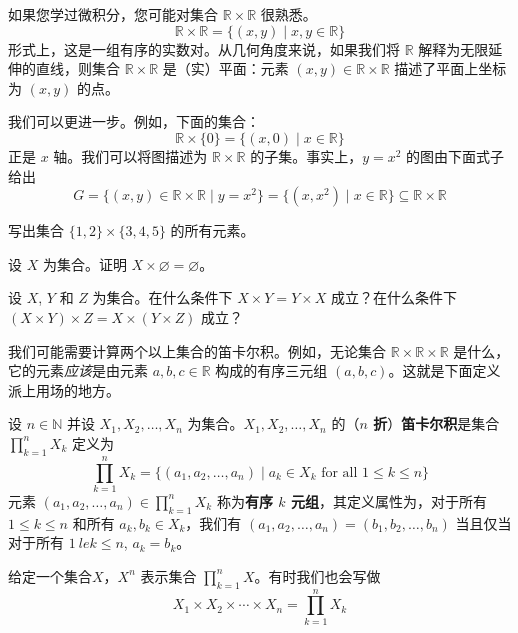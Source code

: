 \begin{example}
如果您学过微积分，您可能对集合 $\mathbb{R} \times \mathbb{R}$ 很熟悉。
\[ \mathbb{R} \times \mathbb{R} = \{ (x,y) \mid x,y \in \mathbb{R} \} \]
形式上，这是一组有序的实数对。从几何角度来说，如果我们将 $\mathbb{R}$ 解释为无限延伸的直线，则集合 $\mathbb{R} \times \mathbb{R}$ 是（实）平面：元素 $(x,y) \in \mathbb{R} \times \mathbb{R}$ 描述了平面上坐标为 $(x,y)$ 的点。

我们可以更进一步。例如，下面的集合：
\[ \mathbb{R} \times \{ 0 \} = \{ (x,0) \mid x \in \mathbb{R} \} \]
正是 $x$ 轴。我们可以将图描述为 $\mathbb{R} \times \mathbb{R}$ 的子集。事实上，$y=x^2$ 的图由下面式子给出
\[ G = \{ (x,y) \in \mathbb{R} \times \mathbb{R} \mid y = x^2 \} = \{ (x,x^2) \mid x \in \mathbb{R} \} \subseteq \mathbb{R} \times \mathbb{R} \]
\end{example}

\begin{exercise}
写出集合 $\{ 1, 2 \} \times \{ 3, 4, 5 \}$ 的所有元素。
\end{exercise}

\begin{exercise}
设 $X$ 为集合。证明 $X \times \varnothing = \varnothing$。
\end{exercise}

\begin{exercise}
\label{exCartesianProductNotAssociative}
设 $X$, $Y$ 和 $Z$ 为集合。在什么条件下 $X \times Y = Y \times X$ 成立？在什么条件下 $(X \times Y) \times Z = X \times (Y \times Z)$ 成立？
\end{exercise}

我们可能需要计算两个以上集合的笛卡尔积。例如，无论集合 $\mathbb{R} \times \mathbb{R} \times \mathbb{R}$ 是什么，它的元素\textit{应该}是由元素 $a,b,c \in \mathbb{R}$ 构成的有序三元组 $(a,b,c)$。这就是下面定义派上用场的地方。

\begin{definition}
\label{defCartesianProductNFold}
设 $n \in \mathbb{N}$ 并设 $X_1, X_2, \dots, X_n$ 为集合。$X_1, X_2, \dots, X_n$ 的（\textbf{$n$ 折}）\textbf{笛卡尔积}是集合 $\prod_{k=1}^n X_k$  定义为 
\[ \prod_{k=1}^n X_k = \{ (a_1, a_2, \dots, a_n) \mid a_k \in X_k \text{ for all } 1 \le k \le n \} \]
元素 $(a_1, a_2, \dots, a_n) \in \prod_{k=1}^n X_k$ 称为\textbf{有序 $k$ 元组}，其定义属性为，对于所有 $1 \le k \le n $ 和所有 $a_k,b_k \in X_k$，我们有 $(a_1, a_2, \dots, a_n) = (b_1, b_2, \dots, b_n)$ 当且仅当对于所有 $1 \ le k \le n$, $a_k = b_k$。

给定一个集合$X$，$X^n$ 表示集合 $\prod_{k=1}^n X$。有时我们也会写做
\[ X_1 \times X_2 \times \cdots \times X_n = \prod_{k=1}^n X_k \]
\end{definition}

